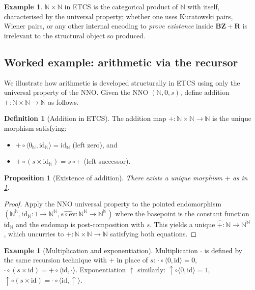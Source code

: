 \documentclass[12pt]{article}
\newtheorem{proposition}[theorem]{Proposition}
\theoremstyle{definition}
\newtheorem{definition}[theorem]{Definition}
\newtheorem{example}[theorem]{Example}
\theoremstyle{remark}
\begin{document}
\begin{example}
$\mathbb{N} \times \mathbb{N}$ in ETCS is the categorical product of $\mathbb{N}$ with
itself, characterised by the universal property; whether one uses Kuratowski pairs,
Wiener pairs, or any other internal encoding to \emph{prove existence} inside
$\mathbf{BZ+R}$ is irrelevant to the structural object so produced.
\end{example}

\subsection{Worked example: arithmetic via the recursor}

We illustrate how arithmetic is developed structurally in ETCS using only the universal
property of the NNO. Given the NNO $(\mathbb{N},0,s)$, define addition
$+:\mathbb{N}\times\mathbb{N}\to\mathbb{N}$ as follows.

\begin{definition}[Addition in ETCS]
\label{def:etcsadd}
The addition map $+: \mathbb{N}\times\mathbb{N}\to\mathbb{N}$ is the unique morphism
satisfying:
\begin{itemize}
\item $+ \circ \langle 0_{\mathbb{N}}, \mathrm{id}_{\mathbb{N}}\rangle = \mathrm{id}_{\mathbb{N}}$ (left zero), and
\item $+ \circ (s\times \mathrm{id}_{\mathbb{N}}) = s \circ +$ (left successor).
\end{itemize}
\end{definition}

\begin{proposition}[Existence of addition]
\label{prop:etcsadd}
There exists a unique morphism $+$ as in \cref{def:etcsadd}.
\end{proposition}
\begin{proof}
Apply the NNO universal property to the pointed endomorphism
$(\mathbb{N}^{\mathbb{N}}, \mathrm{id}_{\mathbb{N}} : 1\to \mathbb{N}^{\mathbb{N}},
\widehat{s\circ\mathrm{ev}}: \mathbb{N}^{\mathbb{N}}\to \mathbb{N}^{\mathbb{N}})$ where
the basepoint is the constant function $\mathrm{id}_{\mathbb{N}}$ and the endomap is
post-composition with $s$. This yields a unique
$\widehat{+}: \mathbb{N} \to \mathbb{N}^{\mathbb{N}}$, which uncurries to
$+: \mathbb{N}\times\mathbb{N}\to \mathbb{N}$ satisfying both equations.
\end{proof}

\begin{example}[Multiplication and exponentiation]
Multiplication $\cdot$ is defined by the same recursion technique with
$+$ in place of $s$:
$\cdot\circ\langle 0,\mathrm{id}\rangle = 0$, $\cdot\circ (s\times \mathrm{id}) =
+\circ\langle\mathrm{id},\cdot\rangle$.
Exponentiation $\uparrow$ similarly: $\uparrow\circ\langle 0,\mathrm{id}\rangle = 1$,
$\uparrow\circ (s\times \mathrm{id}) = \cdot\circ\langle\mathrm{id},\uparrow\rangle$.
\end{example}
\end{document}
